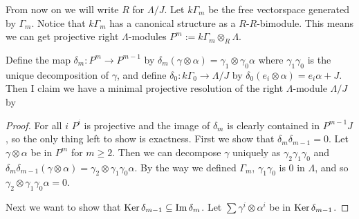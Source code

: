 From now on we will write $R$ for $\Lambda/J$. Let $k\Gamma_m$ be the free vectorspace generated by $\Gamma_m$. Notice that $k\Gamma_m$ has a canonical structure as a $R$-$R$-bimodule. This means we can get projective right $\Lambda$-modules $P^m := k\Gamma_m\otimes_R\Lambda$.

Define the map $\delta_m : P^m \to P^{m-1}$ by $\delta_m(\gamma \otimes \alpha) = \gamma_1 \otimes \gamma_0\alpha$ where $\gamma_1\gamma_0$ is the unique decomposition of $\gamma$, and define $\delta_0:k\Gamma_0 \to \Lambda /J$ by $\delta_0(e_i\otimes \alpha) = e_i\alpha + J$. Then I claim we have a minimal projective resolution of the right $\Lambda$-module $\Lambda/J$ by

\begin{center}
\end{center}

\begin{proof}
	For all $i$ $P^i$ is projective and the image of $\delta_m$ is clearly contained in $P^{m-1}J$, so the only thing left to show is exactness. First we show that $\delta_m\delta_{m-1}=0$. Let $\gamma\otimes \alpha$ be in $P^m$ for $m \geq 2$. Then we can decompose $\gamma$ uniquely as $\gamma_2\gamma_1\gamma_0$ and $\delta_m\delta_{m-1}(\gamma\otimes \alpha) = \gamma_2\otimes\gamma_1\gamma_0\alpha$. By the way we defined $\Gamma_m$, $\gamma_1\gamma_0$ is 0 in $\Lambda$, and so $\gamma_2\otimes\gamma_1\gamma_0\alpha = 0$.
	
	Next we want to show that $\operatorname{Ker}\delta_{m-1} \subseteq \operatorname{Im}\delta_m$. Let $\sum \gamma^i\otimes \alpha^i$ be in $\operatorname{Ker}\delta_{m-1}$. 
\end{proof}
